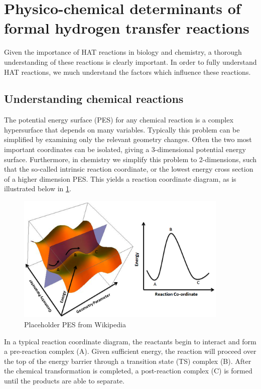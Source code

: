 \newpage

\section{Physico-chemical determinants of formal hydrogen transfer reactions}

Given the importance of HAT reactions in biology and chemistry, a thorough
understanding of these reactions is clearly important. In order to fully
understand HAT reactions, we much understand the factors which influence these
reactions.

\subsection{Understanding chemical reactions}

The potential energy surface (PES) for any chemical reaction is a complex
hypersurface that depends on many variables. Typically this problem can be
simplified by examining only the relevant geometry changes. Often the two most
important coordinates can be isolated, giving a 3-dimensional potential energy
surface. Furthermore, in chemistry we simplify this problem to 2-dimensions,
such that the so-called intrinsic reaction coordinate, or the lowest energy
cross section of a higher dimension PES. This yields a reaction coordinate
diagram, as is illustrated below in \ref{fig:pes}.

\begin{figure}[htb]
  \centering
  \includegraphics[width=0.9\textwidth]{figures/pes}
  \caption{Placeholder PES from Wikipedia}
  \label{fig:pes}
\end{figure}

\noindent In a typical reaction coordinate diagram, the reactants begin to
interact and form a pre-reaction complex (A). Given sufficient energy, the
reaction will proceed over the top of the energy barrier through a transition
state (TS) complex (B). After the chemical transformation is completed, a
post-reaction complex (C) is formed until the products are able to separate.

